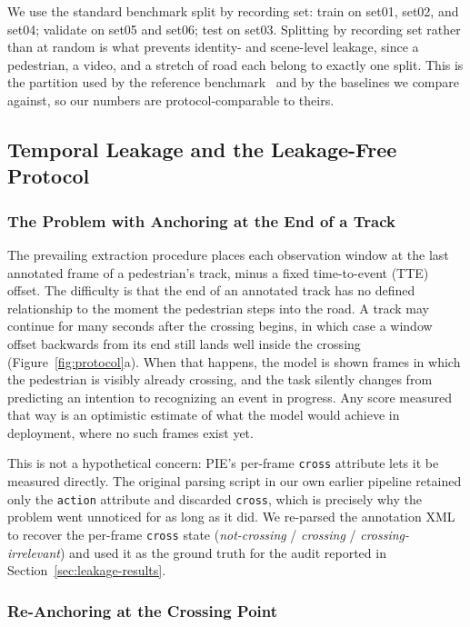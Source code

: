 \documentclass[mti,article,submit,moreauthors]{Definitions/mdpi}
\begin{document}
We use the standard benchmark split by recording set: train on set01, set02, and set04; validate on set05 and set06; test on set03. Splitting by recording set rather than at random is what prevents identity- and scene-level leakage, since a pedestrian, a video, and a stretch of road each belong to exactly one split. This is the partition used by the reference benchmark~\citep{kotseruba2021benchmark} and by the baselines we compare against, so our numbers are protocol-comparable to theirs.

\subsection{Temporal Leakage and the Leakage-Free Protocol}
\label{sec:leakage}

\subsubsection{The Problem with Anchoring at the End of a Track}

The prevailing extraction procedure places each observation window at the last annotated frame of a pedestrian's track, minus a fixed time-to-event (TTE) offset. The difficulty is that the end of an annotated track has no defined relationship to the moment the pedestrian steps into the road. A track may continue for many seconds after the crossing begins, in which case a window offset backwards from its end still lands well inside the crossing (Figure~\ref{fig:protocol}a). When that happens, the model is shown frames in which the pedestrian is visibly already crossing, and the task silently changes from predicting an intention to recognizing an event in progress. Any score measured that way is an optimistic estimate of what the model would achieve in deployment, where no such frames exist yet.

This is not a hypothetical concern: PIE's per-frame \texttt{cross} attribute lets it be measured directly. The original parsing script in our own earlier pipeline retained only the \texttt{action} attribute and discarded \texttt{cross}, which is precisely why the problem went unnoticed for as long as it did. We re-parsed the annotation XML to recover the per-frame \texttt{cross} state (\emph{not-crossing} / \emph{crossing} / \emph{crossing-irrelevant}) and used it as the ground truth for the audit reported in Section~\ref{sec:leakage-results}.

\subsubsection{Re-Anchoring at the Crossing Point}
\end{document}
